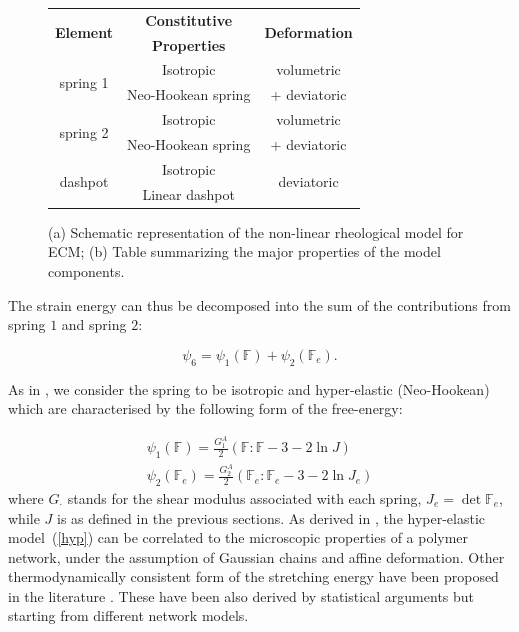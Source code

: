 \documentclass[runningheads]{llncs}
\newcommand{\F}{\ensuremath{\mathbb{F}}}
\begin{document}
\begin{figure}
		\begin{subfigure}{0.32\textwidth}
			\centering
			\large
		\def\svgwidth{0.9\linewidth}
		
		\caption{}
		\label{fig1A}
		\end{subfigure}
	\hspace{20mm}
			\begin{subtable}{0.375\textwidth}
				\hspace{-15mm}
			\begin{tabular}{|c | c | c|}	
				\hline
				\multirow{2}{*}{\textbf{ Element } }& \textbf{ Constitutive } & \multirow{2}{*}{\textbf{ Deformation }} \\
				& \textbf{Properties} &\\
				\hline	
				 \multirow{2}{*}{ spring 1 } & Isotropic  & volumetric\\
				 &Neo-Hookean spring& + deviatoric\\
			 	\hline
				\multirow{2}{*}{ spring 2 } & Isotropic  & volumetric\\
				&Neo-Hookean spring &+ deviatoric\\ 
				\hline
				\multirow{2}{*}{dashpot}  & Isotropic  & 	\multirow{2}{*}{deviatoric}\\
				& Linear dashpot & \\
				\hline
			\end{tabular}
			\caption{}
		\end{subtable}
	\caption{(a) Schematic representation of the non-linear rheological model for ECM; (b) Table summarizing the major properties of the model components.}
\end{figure}

The strain energy can thus be decomposed into the sum of the contributions from spring $1$ and spring $2$:

\begin{equation}
\psi_6 = \psi_1(\F) + \psi_2(\F_e).
\end{equation}

As in \cite{ecm2}, we consider the spring to be isotropic and hyper-elastic (Neo-Hookean) which are characterised by the following form of the free-energy:

\begin{eqnarray}
\psi_1(\F) = \frac{G^A_1}{2} \left(\F:\F - 3 -2 \ln J\right)\\
\psi_2(\F_e) = \frac{G^A_2}{2} \left(\F_e:\F_e - 3 -2 \ln J_{e}\right)\label{hyp}
\end{eqnarray}
where $G_\mathbf{\cdot}$ stands for the shear modulus associated with each spring, $J_e= \det \F_e$, while $J$ is as defined in the previous sections. As derived in \cite{floryprinciples}, the hyper-elastic model~(\ref{hyp}) can be correlated to the microscopic properties of a polymer network, under the assumption of Gaussian chains and affine deformation. Other thermodynamically consistent form of the stretching energy have been proposed in the literature \cite{BERGSTROM1998931,boyce2,doi}. These have been also derived by statistical arguments but starting from different network models.
\end{document}
